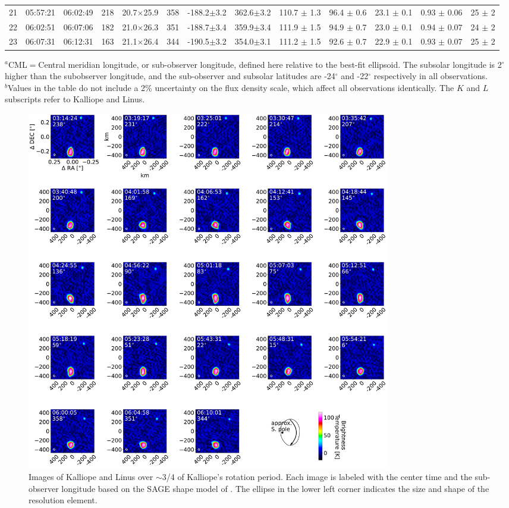 \documentclass[]{aastex631}
\begin{document}
\begin{table}[h!]
\begin{center}
\begin{tabular}{ccccccccccccc}
21 & 05:57:21 & 06:02:49 & 218 & 20.7$\times$25.9 & 358 & -188.2$\pm$3.2 & 362.6$\pm$3.2 & 110.7 $\pm$ 1.3 & 96.4 $\pm$ 0.6 & 23.1 $\pm$ 0.1 & 0.93 $\pm$ 0.06 & 25 $\pm$ 2 \\ 
22 & 06:02:51 & 06:07:06 & 182 & 21.0$\times$26.3 & 351 & -188.7$\pm$3.4 & 359.9$\pm$3.4 & 111.9 $\pm$ 1.5 & 94.9 $\pm$ 0.7 & 23.0 $\pm$ 0.1 & 0.94 $\pm$ 0.07 & 24 $\pm$ 2 \\ 
23 & 06:07:31 & 06:12:31 & 163 & 21.1$\times$26.4 & 344 & -190.5$\pm$3.2 & 354.0$\pm$3.1 & 111.2 $\pm$ 1.5 & 92.6 $\pm$ 0.7 & 22.9 $\pm$ 0.1 & 0.93 $\pm$ 0.07 & 25 $\pm$ 2 \\ 
\end{tabular}
\end{center}
$^a$CML$=$Central meridian longitude, or sub-observer longitude, defined here relative to the best-fit ellipsoid. The subsolar longitude is 2$^{\circ}$ higher than the subobserver longitude, and the sub-observer and subsolar latitudes are -24$^{\circ}$ and -22$^{\circ}$ respectively in all observations.\\
$^b$Values in the table do not include a 2\% uncertainty on the flux density scale, which affect all observations identically. The $K$ and $L$ subscripts refer to Kalliope and Linus.
\end{table}

\begin{figure}[ht!]
\centering
\includegraphics[width=16cm]{Kalliope_AllImages_Mar2024.pdf}
\caption{Images of Kalliope and Linus over $\sim$3/4 of Kalliope's rotation period. Each image is labeled with the center time and the sub-observer longitude based on the SAGE shape model of \cite{ferrais2022}. The ellipse in the lower left corner indicates the size and shape of the resolution element. \label{fig:allims}}
\end{figure}
\end{document}
